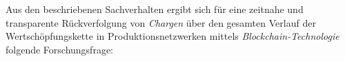 




Aus den beschriebenen Sachverhalten ergibt sich für eine zeitnahe und transparente Rückverfolgung von \textit{Chargen} über den gesamten Verlauf der Wertschöpfungskette in Produktionsnetzwerken mittels \textit{Blockchain-Technologie} folgende Forschungsfrage:

